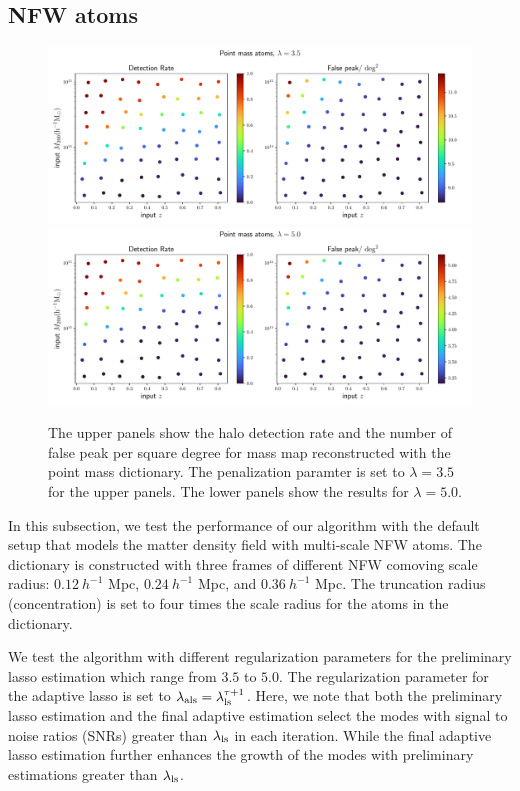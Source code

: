 \documentclass[twocolumn]{aastex62}
\begin{document}
\subsection{NFW atoms}
\label{subsec:test-nfw}

\begin{figure}[!ht]
 \centering
 \includegraphics[width=1.0\textwidth]{detfalseRate_f1-1.pdf}
 \includegraphics[width=1.0\textwidth]{detfalseRate_f1-3.pdf}
 \caption{The upper panels show the halo detection rate and the number of false
     peak per square degree for mass map reconstructed with the point mass
     dictionary. The penalization paramter is set to $\lambda=3.5$ for the
     upper panels.  The lower panels show the results for $\lambda=5.0$.
        }\label{fig_detFalsRatePM}
\end{figure}

In this subsection, we test the performance of our algorithm with the default
setup that models the matter density field with multi-scale NFW atoms. The
dictionary is constructed with three frames of different NFW comoving scale
radius: $0.12~h^{-1}$ Mpc, $0.24~h^{-1}$ Mpc, and $0.36~h^{-1}$ Mpc.  The
truncation radius (concentration) is set to four times the scale radius for the
atoms in the dictionary.

We test the algorithm with different regularization parameters for the
preliminary lasso estimation which range from $3.5$ to $5.0$. The
regularization parameter for the adaptive lasso is set to
$\lambda_{\rm{als}}=\lambda_{\rm{ls}}^{\tau+1}$.
Here, we note that both the preliminary lasso estimation and the final adaptive
estimation select the modes with signal to noise ratios (SNRs) greater than
$\lambda_{\rm{ls}}$ in each iteration. While the final adaptive lasso
estimation further enhances the growth of the modes with preliminary
estimations greater than $\lambda_{\rm{ls}}$.
\end{document}
